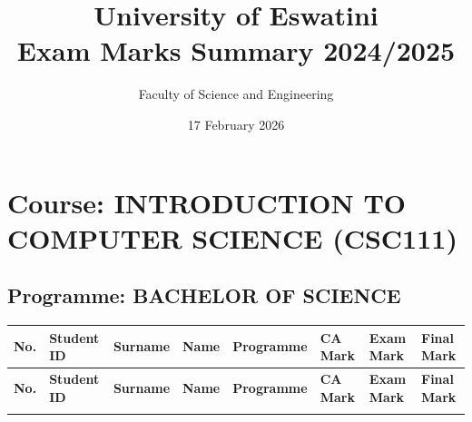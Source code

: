 \documentclass[12pt]{article}
\title{University of Eswatini \\ Exam Marks Summary 2024/2025}
\author{Faculty of Science and Engineering}
\date{17 February 2026}
\begin{document}
\maketitle

\section*{Course: INTRODUCTION TO COMPUTER SCIENCE (CSC111)}
\subsection*{Programme: BACHELOR OF SCIENCE}

\begin{longtable}{@{}llllllll@{}}
\toprule
\textbf{No.} & \textbf{Student ID} & \textbf{Surname} & \textbf{Name} & \textbf{Programme} & \textbf{CA Mark} & \textbf{Exam Mark} & \textbf{Final Mark} \\
\midrule
\endfirsthead

\toprule
\textbf{No.} & \textbf{Student ID} & \textbf{Surname} & \textbf{Name} & \textbf{Programme} & \textbf{CA Mark} & \textbf{Exam Mark} & \textbf{Final Mark} \\
\midrule
\endhead

\bottomrule
\endfoot


\end{longtable}
\end{document}
